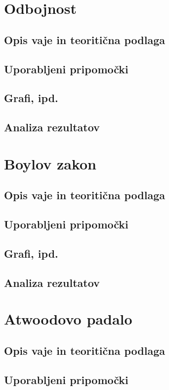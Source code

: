 \documentclass[12pt]{article}
\begin{document}
\newpage
\section{Odbojnost}
	\subsection*{Opis vaje in teoritična podlaga}
	\subsection*{Uporabljeni pripomočki}
	\subsection*{Grafi, ipd.}
	\subsection*{Analiza rezultatov}

\newpage
\section{Boylov zakon}
	\subsection*{Opis vaje in teoritična podlaga}
	\subsection*{Uporabljeni pripomočki}
	\subsection*{Grafi, ipd.}
	\subsection*{Analiza rezultatov}

\newpage
\section{Atwoodovo padalo}
	\subsection*{Opis vaje in teoritična podlaga}
	\subsection*{Uporabljeni pripomočki}
\end{document}
